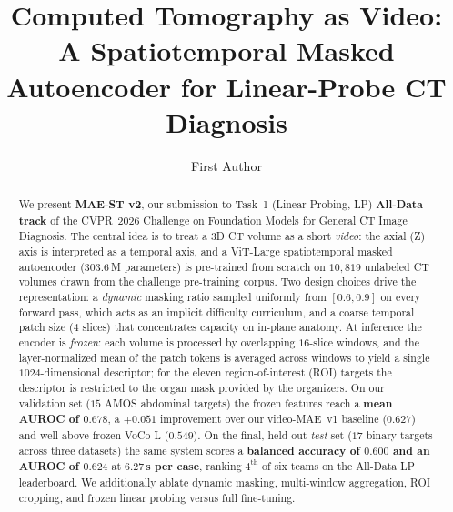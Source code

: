 \documentclass[runningheads]{llncs}
\begin{document}
\title{Computed Tomography as Video: A Spatiotemporal Masked Autoencoder for Linear-Probe CT Diagnosis}

\author{First Author}

\maketitle

\begin{abstract}
We present \textbf{MAE-ST v2}, our submission to Task~1 (Linear Probing, LP)
\textbf{All-Data track} of the CVPR~2026 Challenge on Foundation Models for
General CT Image Diagnosis. The central idea is to treat a 3D CT volume as a
short \emph{video}: the axial (Z) axis is interpreted as a temporal axis, and a
ViT-Large spatiotemporal masked autoencoder ($303.6$\,M parameters) is
pre-trained from scratch on $10{,}819$ unlabeled CT volumes drawn from the
challenge pre-training corpus. Two design choices drive the representation: a
\emph{dynamic} masking ratio sampled uniformly from $[0.6, 0.9]$ on every
forward pass, which acts as an implicit difficulty curriculum, and a coarse
temporal patch size ($4$ slices) that concentrates capacity on in-plane
anatomy. At inference the encoder is \emph{frozen}: each volume is processed by
overlapping $16$-slice windows, and the layer-normalized mean of the patch
tokens is averaged across windows to yield a single $1024$-dimensional
descriptor; for the eleven region-of-interest (ROI) targets the descriptor is
restricted to the organ mask provided by the organizers. On our validation set
($15$ AMOS abdominal targets) the frozen features reach a \textbf{mean AUROC of
$0.678$}, a $+0.051$ improvement over our video-MAE~v1 baseline ($0.627$) and
well above frozen VoCo-L ($0.549$). On the final, held-out \emph{test} set
($17$ binary targets across three datasets) the same system scores a
\textbf{balanced accuracy of $0.600$ and an AUROC of $0.624$} at
\textbf{$6.27$\,s per case}, ranking $4^{\text{th}}$ of six teams on the
All-Data LP leaderboard. We additionally ablate dynamic masking, multi-window
aggregation, ROI cropping, and frozen linear probing versus full fine-tuning. \\[4pt]
\end{abstract}
\end{document}
